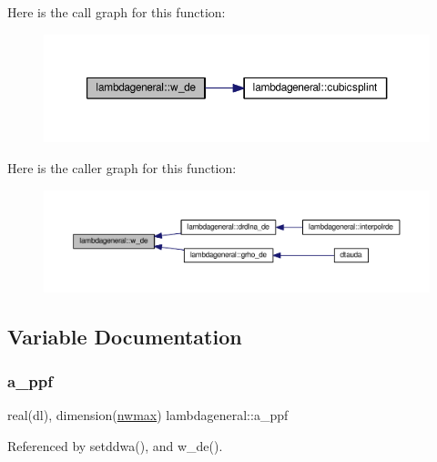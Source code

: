 Here is the call graph for this function\+:
\nopagebreak
\begin{figure}[H]
\begin{center}
\leavevmode
\includegraphics[width=350pt]{namespacelambdageneral_a5025e65d45f07326ea66833cbab495d3_cgraph}
\end{center}
\end{figure}
Here is the caller graph for this function\+:
\nopagebreak
\begin{figure}[H]
\begin{center}
\leavevmode
\includegraphics[width=350pt]{namespacelambdageneral_a5025e65d45f07326ea66833cbab495d3_icgraph}
\end{center}
\end{figure}


\subsection{Variable Documentation}
\mbox{\label{namespacelambdageneral_a01ecf8d62de8dba202404c6c64743084}} 
\subsubsection{\texorpdfstring{a\+\_\+ppf}{a\_ppf}}
{\footnotesize\ttfamily real(dl), dimension(\mbox{\hyperlink{namespacelambdageneral_a72ab4fcacd74a66fe577794d5294864b}{nwmax}}) lambdageneral\+::a\+\_\+ppf}



Referenced by setddwa(), and w\+\_\+de().

\mbox{\label{namespacelambdageneral_a3c9598fcf92daa2c3f6715e256e50c98}} 
